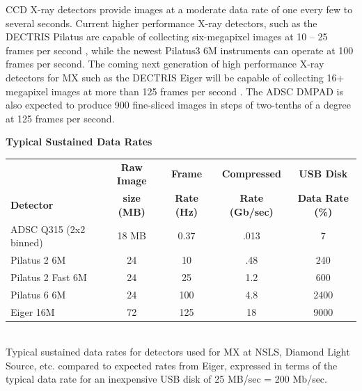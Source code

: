 \documentclass[11pt]{a0poster}
\begin{document}
\begin{minipage}[]{0.29\linewidth}
\fontsize{18}{22}\selectfont%
CCD X-ray detectors provide images at a moderate data rate of one every
few to several seconds. Current higher performance X-ray detectors, such as the DECTRIS Pilatus
are capable of collecting six-megapixel images at 10 -- 25 frames per
second \cite{Trueb2012}, while the newest Pilatus3 6M instruments can
operate at 100 frames per second. The coming next generation of high performance 
X-ray detectors for MX such as the DECTRIS Eiger will be capable of collecting
16+ megapixel images at more than 125 frames per second \cite[page 6]{Willmott2011} \cite{Johnson2012}.
The ADSC DMPAD \cite{Hamlin2012} is also expected
to produce 900 fine-sliced images in steps of two-tenths of a degree
at 125 frames per second.

\begin{center}
{\fontsize{20}{24}\selectfont%
 \bf Typical Sustained Data Rates}
\begin{tabular}{lcccc}
\hline
         & {\bf Raw Image}& {\bf Frame}& {\bf Compressed} & {\bf USB Disk}\\
{\bf Detector }& {\bf size (MB) }&{\bf Rate (Hz) }& {\bf Rate (Gb/sec)}& {\bf Data Rate (\%)}\\
\hline
ADSC Q315 (2x2 binned) & 18 MB & 0.37 & .013 & 7 \\
Pilatus 2 6M      & 24& 10 & .48 & 240\\
Pilatus 2 Fast 6M & 24 & 25 & 1.2 & 600\\
Pilatus 6 6M      & 24& 100 & 4.8 & 2400\\
Eiger 16M         &72& 125 & 18& 9000 \\
\hline
\end{tabular}
{\fontsize{16}{20}\selectfont%
\vspace{3mm}\\
Typical sustained data rates for detectors used for MX at NSLS, Diamond Light
Source, etc. compared to expected rates from Eiger, expressed in terms of the 
typical data rate for an inexpensive
USB disk of 25 MB/sec = 200 Mb/sec.} 

\end{center}



\end{minipage}
\end{document}
